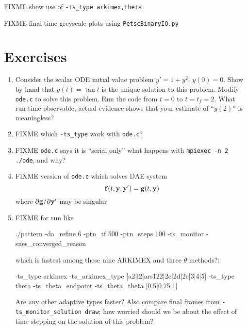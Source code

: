 




FIXME show use of \texttt{-ts\_type arkimex,theta}

FIXME final-time greyscale plots using \texttt{PetscBinaryIO.py}


\section{Exercises}

\renewcommand{\labelenumi}{\arabic{chapter}.\arabic{enumi}\quad}
\renewcommand{\labelenumii}{(\alph{enumii})}
\begin{enumerate}
\item \label{exer:ts:tan}  Consider the scalar ODE initial value problem $y'=1+y^2$, $y(0)=0$.  Show by-hand that $y(t)=\tan t$ is the unique solution to this problem.  Modify \texttt{ode.c} to solve this problem.  Run the code from $t=0$ to $t=t_f=2$.  What run-time observable, actual evidence shows that your estimate of ``$y(2)$'' is meaningless?
\item FIXME which \texttt{-ts\_type} work with \texttt{ode.c}?
\item FIXME \texttt{ode.c} says it is ``serial only''  what happens with \texttt{mpiexec -n 2 ./ode}, and why?
\item FIXME version of \texttt{ode.c} which solves DAE system
    $$\mathbf{f}(t,\mathbf{y},\mathbf{y}') = \mathbf{g}(t,\mathbf{y})$$
where $\partial \mathbf{g}/\partial \mathbf{y}'$ may be singular
\item FIXME for run like
\begin{cline}
./pattern -da_refine 6 -ptn_tf 500 -ptn_steps 100 -ts_monitor -snes_converged_reason
\end{cline}
which is fastest among these nine ARKIMEX and three $\theta$ methods?:
\begin{code}
-ts_type arkimex -ts_arkimex_type [a2|l2|ars122|2c|2d|2e|3|4|5]
-ts_type theta -ts_theta_endpoint -ts_theta_theta [0.5|0.75|1]
\end{code}
Are any other adaptive \pTS types faster?  Also compare final frames from \texttt{-ts\_monitor\_solution draw}; how worried should we be about the effect of time-stepping on the solution of this problem?
\end{enumerate}
